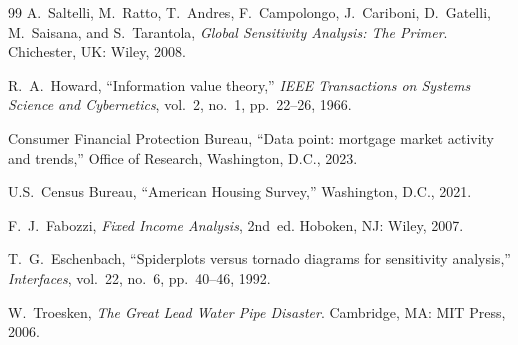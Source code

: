 \documentclass[11pt, letterpaper]{article}
\begin{document}
\begin{thebibliography}{99}
  A.~Saltelli, M.~Ratto, T.~Andres, F.~Campolongo, J.~Cariboni, D.~Gatelli, M.~Saisana, and S.~Tarantola, \textit{Global Sensitivity Analysis: The Primer}.
  Chichester, UK: Wiley, 2008.

  R.~A.~Howard, ``Information value theory,''
  \textit{IEEE Transactions on Systems Science and Cybernetics}, vol.~2, no.~1, pp.~22--26, 1966.

  Consumer Financial Protection Bureau, ``Data point: mortgage market activity and trends,''
  Office of Research, Washington, D.C., 2023.

  U.S.\ Census Bureau, ``American Housing Survey,''
  Washington, D.C., 2021.

  F.~J.~Fabozzi, \textit{Fixed Income Analysis}, 2nd~ed.
  Hoboken, NJ: Wiley, 2007.

  T.~G.~Eschenbach, ``Spiderplots versus tornado diagrams for sensitivity analysis,''
  \textit{Interfaces}, vol.~22, no.~6, pp.~40--46, 1992.

  W.~Troesken, \textit{The Great Lead Water Pipe Disaster}.
  Cambridge, MA: MIT Press, 2006.

\end{thebibliography}
\end{document}
